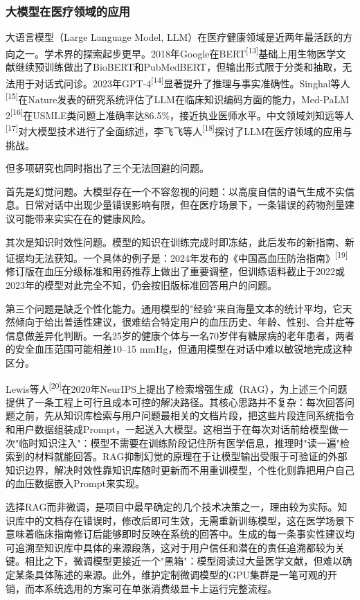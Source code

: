 \documentclass[zihao=-4,a4paper]{ctexart}
\numberwithin{figure}{section}
\numberwithin{table}{section}
\begin{document}
\subsubsection{大模型在医疗领域的应用}

大语言模型（Large Language Model, LLM）在医疗健康领域是近两年最活跃的方向之一。学术界的探索起步更早。2018年Google在BERT\textsuperscript{[13]}基础上用生物医学文献继续预训练做出了BioBERT和PubMedBERT，但输出形式限于分类和抽取，无法用于对话式问诊。2023年GPT-4\textsuperscript{[14]}显著提升了推理与事实准确性。Singhal等人\textsuperscript{[15]}在Nature发表的研究系统评估了LLM在临床知识编码方面的能力，Med-PaLM 2\textsuperscript{[16]}在USMLE类问题上准确率达86.5\%，接近执业医师水平。中文领域刘知远等人\textsuperscript{[17]}对大模型技术进行了全面综述，李飞飞等人\textsuperscript{[18]}探讨了LLM在医疗领域的应用与挑战。

但多项研究也同时指出了三个无法回避的问题。

首先是幻觉问题。大模型存在一个不容忽视的问题：以高度自信的语气生成不实信息。日常对话中出现少量错误影响有限，但在医疗场景下，一条错误的药物剂量建议可能带来实实在在的健康风险。

其次是知识时效性问题。模型的知识在训练完成时即冻结，此后发布的新指南、新证据均无法获知。一个具体的例子是：2024年发布的《中国高血压防治指南》\textsuperscript{[19]}修订版在血压分级标准和用药推荐上做出了重要调整，但训练语料截止于2022或2023年的模型对此完全不知，仍会按旧版标准回答用户的问题。

第三个问题是缺乏个性化能力。通用模型的"经验"来自海量文本的统计平均，它天然倾向于给出普适性建议，很难结合特定用户的血压历史、年龄、性别、合并症等信息做差异化判断。一名25岁的健康个体与一名70岁伴有糖尿病的老年患者，两者的安全血压范围可能相差10--15 mmHg，但通用模型在对话中难以敏锐地完成这种区分。

Lewis等人\textsuperscript{[20]}在2020年NeurIPS上提出了检索增强生成（RAG），为上述三个问题提供了一条工程上可行且成本可控的解决路径。其核心思路并不复杂：每次回答问题之前，先从知识库检索与用户问题最相关的文档片段，把这些片段连同系统指令和用户数据组装成Prompt，一起送入大模型。这相当于在每次对话前给模型做一次"临时知识注入"：模型不需要在训练阶段记住所有医学信息，推理时"读一遍"检索到的材料就能回答。RAG抑制幻觉的原理在于让模型输出受限于可验证的外部知识边界，解决时效性靠知识库随时更新而不用重训模型，个性化则靠把用户自己的血压数据嵌入Prompt来实现。

选择RAG而非微调，是项目中最早确定的几个技术决策之一，理由较为实际。知识库中的文档存在错误时，修改后即可生效，无需重新训练模型，这在医学场景下意味着临床指南修订后能够即时反映在系统的回答中。生成的每一条事实性建议均可追溯至知识库中具体的来源段落，这对于用户信任和潜在的责任追溯都较为关键。相比之下，微调模型更接近一个"黑箱"：模型阅读过大量医学文献，但难以确定某条具体陈述的来源。此外，维护定制微调模型的GPU集群是一笔可观的开销，而本系统选用的方案可在单张消费级显卡上运行完整流程。
\end{document}
